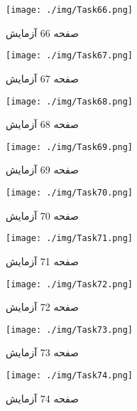 
\begin{figure}[htpb]
\centering
\texttt{[image: ./img/Task66.png]}
\caption{ صفحه 66 آزمایش }
\label{fig:Task66}
\end{figure}
 
 
\begin{figure}[htpb]
\centering
\texttt{[image: ./img/Task67.png]}
\caption{ صفحه 67 آزمایش }
\label{fig:Task67}
\end{figure}
 
 
\begin{figure}[htpb]
\centering
\texttt{[image: ./img/Task68.png]}
\caption{ صفحه 68 آزمایش }
\label{fig:Task68}
\end{figure}
 
 
\begin{figure}[htpb]
\centering
\texttt{[image: ./img/Task69.png]}
\caption{ صفحه 69 آزمایش }
\label{fig:Task69}
\end{figure}
 
 
\begin{figure}[htpb]
\centering
\texttt{[image: ./img/Task70.png]}
\caption{ صفحه 70 آزمایش }
\label{fig:Task70}
\end{figure}
 
 
\begin{figure}[htpb]
\centering
\texttt{[image: ./img/Task71.png]}
\caption{ صفحه 71 آزمایش }
\label{fig:Task71}
\end{figure}
 
 
\begin{figure}[htpb]
\centering
\texttt{[image: ./img/Task72.png]}
\caption{ صفحه 72 آزمایش }
\label{fig:Task72}
\end{figure}
 
 
\begin{figure}[htpb]
\centering
\texttt{[image: ./img/Task73.png]}
\caption{ صفحه 73 آزمایش }
\label{fig:Task73}
\end{figure}
 
 
\begin{figure}[htpb]
\centering
\texttt{[image: ./img/Task74.png]}
\caption{ صفحه 74 آزمایش }
\label{fig:Task74}
\end{figure}
 
